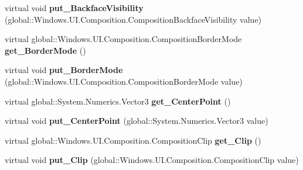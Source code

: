\begin{DoxyCompactItemize}
\item 
\mbox{\label{class_windows_1_1_u_i_1_1_composition_1_1_visual_a3b737ed77f1a9773db7d7bba9085d735}} 
virtual void {\bfseries put\+\_\+\+Backface\+Visibility} (global\+::\+Windows.\+U\+I.\+Composition.\+Composition\+Backface\+Visibility value)
\item 
\mbox{\label{class_windows_1_1_u_i_1_1_composition_1_1_visual_aadde0309db11b0ab71defebf5ac36226}} 
virtual global\+::\+Windows.\+U\+I.\+Composition.\+Composition\+Border\+Mode {\bfseries get\+\_\+\+Border\+Mode} ()
\item 
\mbox{\label{class_windows_1_1_u_i_1_1_composition_1_1_visual_ad4fd972123d9a322d431e5f8790ba7b9}} 
virtual void {\bfseries put\+\_\+\+Border\+Mode} (global\+::\+Windows.\+U\+I.\+Composition.\+Composition\+Border\+Mode value)
\item 
\mbox{\label{class_windows_1_1_u_i_1_1_composition_1_1_visual_a35059d715a23e7424f1d2560320e1cab}} 
virtual global\+::\+System.\+Numerics.\+Vector3 {\bfseries get\+\_\+\+Center\+Point} ()
\item 
\mbox{\label{class_windows_1_1_u_i_1_1_composition_1_1_visual_abaf21711735234faa45f4f4c7eee581d}} 
virtual void {\bfseries put\+\_\+\+Center\+Point} (global\+::\+System.\+Numerics.\+Vector3 value)
\item 
\mbox{\label{class_windows_1_1_u_i_1_1_composition_1_1_visual_ac3938fd79afc01b7c592141ee4b0cf63}} 
virtual global\+::\+Windows.\+U\+I.\+Composition.\+Composition\+Clip {\bfseries get\+\_\+\+Clip} ()
\item 
\mbox{\label{class_windows_1_1_u_i_1_1_composition_1_1_visual_a1d62ae483edf07661fa132e98c1d1dbf}} 
virtual void {\bfseries put\+\_\+\+Clip} (global\+::\+Windows.\+U\+I.\+Composition.\+Composition\+Clip value)
\item 
\mbox{\label{class_windows_1_1_u_i_1_1_composition_1_1_visual_a51075ac8d9a733304f167464da6c84b8}} 

\end{DoxyCompactItemize}

